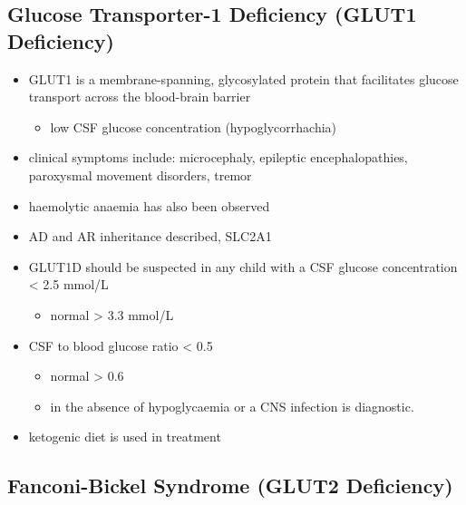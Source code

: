 \documentclass{scrartcl}
\begin{document}
\subsection{Glucose Transporter-1 Deficiency (GLUT1 Deficiency)}
\label{sec:orgdeeb8c1}
\begin{itemize}
\item GLUT1 is a membrane-spanning, glycosylated protein that facilitates
glucose transport across the blood-brain barrier
\begin{itemize}
\item low CSF glucose concentration (hypoglycorrhachia)
\end{itemize}

\item clinical symptoms include: microcephaly, epileptic encephalopathies,
paroxysmal movement disorders, tremor
\item haemolytic anaemia has also been observed

\item AD and AR inheritance described, SLC2A1

\item GLUT1D should be suspected in any child with a CSF glucose
concentration \textless{} 2.5 mmol/L 
\begin{itemize}
\item normal \textgreater{} 3.3 mmol/L
\end{itemize}

\item CSF to blood glucose ratio \textless{} 0.5 
\begin{itemize}
\item normal \textgreater{} 0.6
\item in the absence of hypoglycaemia or a CNS infection is diagnostic.
\end{itemize}
\item ketogenic diet is used in treatment
\end{itemize}

\subsection{Fanconi-Bickel Syndrome (GLUT2 Deficiency)}
\label{sec:orgf6aca91}
\end{document}
